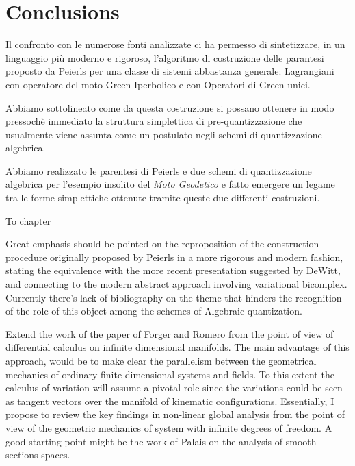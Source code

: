 \documentclass[Main]{subfiles}
\begin{document}
\chapter*{Conclusions}

Il confronto con le numerose fonti analizzate ci ha permesso di sintetizzare, in un linguaggio più moderno e rigoroso,  l'algoritmo  di costruzione  delle parantesi proposto da Peierls per una classe di sistemi abbastanza generale: Lagrangiani con operatore del moto Green-Iperbolico e con Operatori di Green unici.

Abbiamo sottolineato come da questa costruzione si possano ottenere in modo pressochè immediato la struttura simplettica di pre-quantizzazione che usualmente viene assunta come un postulato negli schemi di quantizzazione algebrica.

Abbiamo realizzato le parentesi di Peierls e due schemi di quantizzazione algebrica per l'esempio insolito del \emph{Moto Geodetico} e fatto emergere un legame tra le forme simplettiche ottenute tramite queste due differenti costruzioni.

To chapter 


\vspace{2mm}%


	Great emphasis should be pointed on the reproposition of the construction procedure  originally proposed by Peierls in a more rigorous and modern fashion, stating the equivalence with the more recent presentation suggested by DeWitt, and connecting to the modern abstract approach\cite{Khavkine} involving variational bicomplex.
	Currently there's lack of bibliography on the theme  that hinders the recognition of the role of this object among the schemes of Algebraic quantization.



 Extend the work of the paper of  Forger and Romero\cite{Forger} from the point of view of differential calculus on infinite dimensional manifolds.
	The main advantage of this approach, would be to make clear the parallelism between the geometrical mechanics of ordinary finite dimensional systems and fields. To this extent the calculus of variation will assume a pivotal role since the variations could be seen as tangent vectors over the manifold of  kinematic configurations.
	Essentially, I propose to review the key findings in non-linear global analysis from the point of view of the geometric mechanics of system with infinite degrees of freedom.
	A good starting point might be the work of Palais\cite{Palais} on the analysis of smooth sections spaces.
	
	
\end{document}
